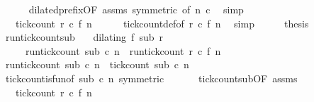 \begin{isabellebody}
\ \ \ \ \isamarkupfalse%
\ dilated{\isacharunderscore}prefix{\isacharbrackleft}OF\ assms{\isacharcomma}\ symmetric{\isacharcomma}\ of\ {\isacartoucheopen}n{\isacartoucheclose}\ {\isacartoucheopen}c{\isacartoucheclose}{\isacharbrackright}\ \isamarkupfalse%
\ simp\isanewline
\ \ \isamarkupfalse%
\ \isamarkupfalse%
\ {\isacartoucheopen}{\isachardot}{\isachardot}{\isachardot}\ {\isacharequal}\ tick{\isacharunderscore}count\ r\ c\ {\isacharparenleft}f\ n{\isacharparenright}{\isacartoucheclose}\isanewline
\ \ \ \ \isamarkupfalse%
\ tick{\isacharunderscore}count{\isacharunderscore}def{\isacharbrackleft}of\ {\isacartoucheopen}r{\isacartoucheclose}\ {\isacartoucheopen}c{\isacartoucheclose}\ {\isacartoucheopen}f\ n{\isacartoucheclose}{\isacharbrackright}\ \isamarkupfalse%
\ simp\isanewline
\ \ \isamarkupfalse%
\ \isamarkupfalse%
\ {\isacharquery}thesis\ \isacommand{{\isachardot}}\isamarkupfalse%
\isanewline
{}\isamarkupfalse%
%
\endisatagproof
{\isafoldproof}%
%
\isadelimproof
\isanewline
%
\endisadelimproof
\isanewline
{}\isamarkupfalse%
\ run{\isacharunderscore}tick{\isacharunderscore}count{\isacharunderscore}sub{\isacharcolon}\isanewline
\ \ \ {\isacartoucheopen}dilating\ f\ sub\ r{\isacartoucheclose}\isanewline
\ \ \ \ \ {\isacartoucheopen}run{\isacharunderscore}tick{\isacharunderscore}count\ sub\ c\ n\ {\isacharequal}\ run{\isacharunderscore}tick{\isacharunderscore}count\ r\ c\ {\isacharparenleft}f\ n{\isacharparenright}{\isacartoucheclose}\isanewline
%
\isadelimproof
%
\endisadelimproof
%
\isatagproof
{}\isamarkupfalse%
\ {\isacharminus}\isanewline
\ \ \isamarkupfalse%
\ {\isacartoucheopen}run{\isacharunderscore}tick{\isacharunderscore}count\ sub\ c\ n\ {\isacharequal}\ tick{\isacharunderscore}count\ sub\ c\ n{\isacartoucheclose}\isanewline
\ \ \ \ \isamarkupfalse%
\ tick{\isacharunderscore}count{\isacharunderscore}is{\isacharunderscore}fun{\isacharbrackleft}of\ {\isacartoucheopen}sub{\isacartoucheclose}\ c\ n{\isacharcomma}\ symmetric{\isacharbrackright}\ \isacommand{{\isachardot}}\isamarkupfalse%
\isanewline
\ \ \isamarkupfalse%
\ \isamarkupfalse%
\ tick{\isacharunderscore}count{\isacharunderscore}sub{\isacharbrackleft}OF\ assms{\isacharbrackright}\ \isamarkupfalse%
\ {\isacartoucheopen}{\isachardot}{\isachardot}{\isachardot}\ {\isacharequal}\ tick{\isacharunderscore}count\ r\ c\ {\isacharparenleft}f\ n{\isacharparenright}{\isacartoucheclose}\ \isacommand{{\isachardot}}\isamarkupfalse%

\end{isabellebody}
